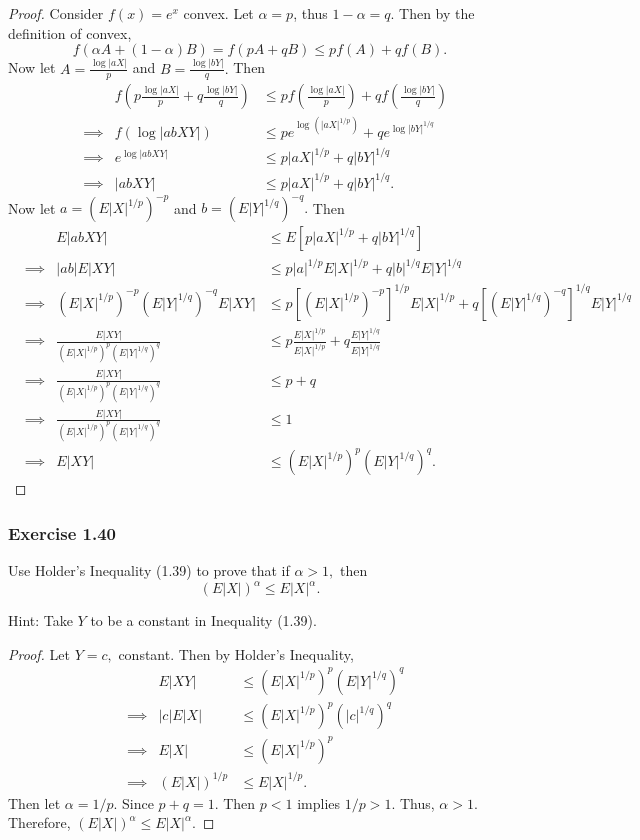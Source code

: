 \documentclass[12pt,]{article}
\begin{document}
\begin{proof}
Consider $f(x) = e^x$ convex. Let $\alpha = p$, thus $1-\alpha = q.$ Then by the definition of convex, 
$$f(\alpha A +(1-\alpha)B) = f(pA+qB)\le pf(A)+qf(B).$$
Now let $A = \frac{\log|aX|}{p}$ and $B = \frac{\log|bY|}{q}.$ Then
\begin{align*}
&& f\left(p\frac{\log|aX|}{p}+q\frac{\log|bY|}{q}\right) & \le pf\left(\frac{\log|aX|}{p}\right)+qf\left(\frac{\log|bY|}{q}\right)\\
& \implies & f(\log|abXY|) & \le pe^{\log(|aX|^{1/p})}+qe^{\log|bY|^{1/q}}\\
& \implies & e^{\log|abXY|} & \le p|aX|^{1/p}+q|bY|^{1/q}\\
& \implies & |abXY| & \le p|aX|^{1/p}+q|bY|^{1/q}.
\end{align*}
Now let $a = (E|X|^{1/p})^{-p}$ and $b = (E|Y|^{1/q})^{-q}.$ Then
\begin{align*}
&& E|abXY| & \le E\left[p|aX|^{1/p}+q|bY|^{1/q}\right]\\
&\implies & |ab|E|XY| & \le p|a|^{1/p}E|X|^{1/p}+q|b|^{1/q}E|Y|^{1/q}\\
& \implies & (E|X|^{1/p})^{-p}(E|Y|^{1/q})^{-q}E|XY| & \le p\left[(E|X|^{1/p})^{-p}\right]^{1/p}E|X|^{1/p} + q\left[(E|Y|^{1/q})^{-q}\right]^{1/q}E|Y|^{1/q}\\
& \implies & \frac{E|XY|}{(E|X|^{1/p})^{p}(E|Y|^{1/q})^{q}} & \le p\frac{E|X|^{1/p}}{E|X|^{1/p}} + q\frac{E|Y|^{1/q}}{E|Y|^{1/q}}\\
& \implies & \frac{E|XY|}{(E|X|^{1/p})^{p}(E|Y|^{1/q})^{q}} & \le p+q\\
& \implies &\frac{E|XY|}{(E|X|^{1/p})^{p}(E|Y|^{1/q})^{q}} & \le 1\\
& \implies & E|XY| & \le (E|X|^{1/p})^{p}(E|Y|^{1/q})^{q}.
\end{align*}
\end{proof}

\hypertarget{exercise-1.40}{%
\subsubsection{Exercise 1.40}\label{exercise-1.40}}

Use Holder's Inequality (1.39) to prove that if \(\alpha > 1,\) then
\[(E|X|)^\alpha\le E|X|^\alpha.\]

Hint: Take \(Y\) to be a constant in Inequality (1.39).

\begin{proof}
Let $Y = c,$ constant. Then by Holder's Inequality, 
\begin{align*}
&& E|XY| & \le (E|X|^{1/p})^p(E|Y|^{1/q})^q\\
& \implies & |c| E|X| & \le (E|X|^{1/p})^p(|c|^{1/q})^q\\
& \implies & E|X| & \le (E|X|^{1/p})^p\\
& \implies & (E|X|)^{1/p} & \le E|X|^{1/p}.
\end{align*}
Then let $\alpha = 1/p.$ Since $p + q = 1.$ Then $p < 1$ implies $1/p > 1.$ Thus, $\alpha > 1.$ Therefore, $(E|X|)^{\alpha} \le E|X|^{\alpha}.$
\end{proof}
\end{document}
